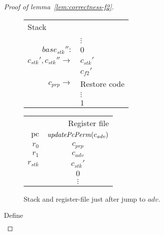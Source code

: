 \documentclass[a4paper]{article}
\newcommand{\var}[1]{\mathit{#1}}
\newcommand{\pcreg}{\mathrm{pc}}
\newcommand{\start}{\var{base}}
\newcommand{\adv}{\var{adv}}
\newcommand{\stk}{\var{stk}}
\newcommand{\plainfun}[2]{
  \ifthenelse{\equal{#2}{}}
  {\mathit{#1}}
  {\mathit{#1}(#2)}
}
\newcommand{\updatePcPerm}[1]{\plainfun{updatePcPerm}{#1}}
\begin{document}
\begin{proof}[Proof of lemma~\ref{lem:correctness-f2}]
                \begin{figure}
                  \centering
                  \begin{tabular}[!h]{r | >{\raggedright\arraybackslash}p{3cm} |}
                    \multicolumn{2}{l}{Stack} \\
                    \cline{2-2}
                 &         \\
                 & $\vdots$ \\
                    \cline{2-2}
                    $\start_\stk'':$   & $0$\\
                    \cline{2-2}
                    $c_\stk',c_\stk'' \rightarrow$   & $c_\stk'$ \\
                    \cline{2-2}
                 & $c_{f2}'$ \\
                    \cline{2-2}
                    $c_{\var{prp}} \rightarrow$   & Restore code \\
                 & $\vdots$ \\
                    \cline{2-2}
                 & $1$\\
                    \cline{2-2}
                  \end{tabular}
                  \hspace{1cm}
                  \begin{tabular}{r |c |}
                    \multicolumn{2}{r}{Register file} \\
                    \cline{2-2}
                    $\pcreg$ & $\updatePcPerm{c_\adv}$\\
                    \cline{2-2}
                    $r_0$  &  $c_{\var{prp}}$ \\
                    \cline{2-2}
                    $r_1$ & $c_\adv$ \\
                    \cline{2-2}
                    $r_{\var{stk}}$  & $c_{\var{stk}}'$ \\
                    \cline{2-2}
                             & $0$ \\
                    \cline{2-2}
                             & $\vdots$ \\
                    \cline{2-2}
                  \end{tabular}
                  \caption{Stack and register-file just after jump to $\adv$.}
                  \label{fig:f2-stack-before-adv}
                \end{figure}
                Define 
                \begin{align*}

\end{align*}
\end{proof}
\end{document}
